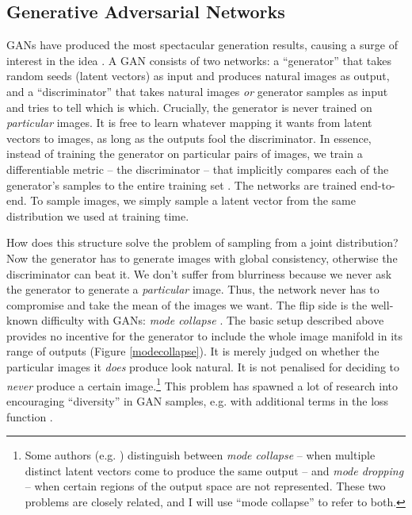 \documentclass[10pt,a4paper]{article}
\newcommand{\nquote}[1]{``{#1}''}
\begin{document}
\subsection{Generative Adversarial Networks}

GANs \citep{gan} have produced the most spectacular generation results, causing a surge of interest in the idea \citep{imagefromcaption,unsupervisedgan,structurestylegan,texttoimagegan,imagetoimagegan,progressivegrowing}. A GAN consists of two networks: a \nquote{generator} that takes random seeds (latent vectors) as input and produces natural images as output, and a \nquote{discriminator} that takes natural images \emph{or} generator samples as input and tries to tell which is which. Crucially, the generator is never trained on \emph{particular} images. It is free to learn whatever mapping it wants from latent vectors to images, as long as the outputs fool the discriminator. In essence, instead of training the generator on particular pairs of images, we train a differentiable metric -- the discriminator -- that implicitly compares each of the generator's samples to the entire training set \citep{wgan}. The networks are trained end-to-end. To sample images, we simply sample a latent vector from the same distribution we used at training time.

How does this structure solve the problem of sampling from a joint distribution? Now the generator has to generate images with global consistency, otherwise the discriminator can beat it. We don't suffer from blurriness because we never ask the generator to generate a \emph{particular} image. Thus, the network never has to compromise and take the mean of the images we want. The flip side is the well-known difficulty with GANs: \emph{mode collapse} \citep{gantechniques}. The basic setup described above provides no incentive for the generator to include the whole image manifold in its range of outputs (Figure \ref{modecollapse}). It is merely judged on whether the particular images it \emph{does} produce look natural. It is not penalised for deciding to \emph{never} produce a certain image.\footnote{Some authors (e.g. \citet{ganmetrics}) distinguish between \emph{mode collapse} -- when multiple distinct latent vectors come to produce the same output -- and \emph{mode dropping} -- when certain regions of the output space are not represented. These two problems are closely related, and I will use \nquote{mode collapse} to refer to both.} This problem has spawned a lot of research into encouraging \nquote{diversity} in GAN samples, e.g. with additional terms in the loss function \citep{gantechniques,energygan,unrolledgan,wgan}.
\end{document}
